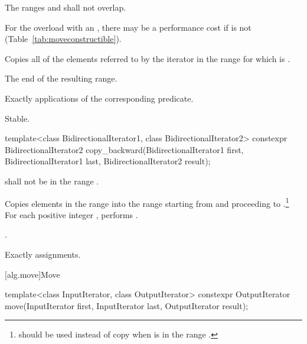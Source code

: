 \begin{itemdescr}
\pnum
\requires The ranges  and  shall not overlap.
\begin{note}
For the overload with an , there may be a performance
cost if  is not
 (Table~\ref{tab:moveconstructible}).
\end{note}

\pnum
\effects Copies all of the elements referred to by the iterator  in the range 
for which  is .

\pnum
\returns The end of the resulting range.

\pnum
\complexity Exactly  applications of the corresponding predicate.

\pnum
\remarks Stable.
\end{itemdescr}

%
\begin{itemdecl}
template<class BidirectionalIterator1, class BidirectionalIterator2>
  constexpr BidirectionalIterator2
    copy_backward(BidirectionalIterator1 first,
                  BidirectionalIterator1 last,
                  BidirectionalIterator2 result);
\end{itemdecl}

\begin{itemdescr}
\pnum
\requires
{}
shall not be in the range
.

\pnum
\effects
Copies elements in the range 
into the
range 
starting from
and proceeding to .\footnote{
should be used instead of copy when 
is in
the range
.}
For each positive integer
,
performs
.

\pnum
\returns
{}.

\pnum
\complexity
Exactly
assignments.
\end{itemdescr}

[alg.move]{Move}

%
\begin{itemdecl}
template<class InputIterator, class OutputIterator>
  constexpr OutputIterator move(InputIterator first, InputIterator last,
                                OutputIterator result);
\end{itemdecl}

